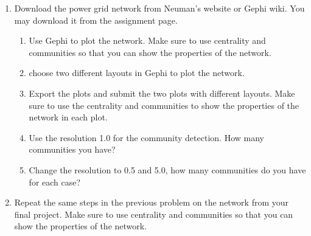 \documentclass{amsart}
\theoremstyle{definition}
\theoremstyle{remark}
\numberwithin{equation}{section}
\begin{document}
\begin{enumerate}
\item Download the power grid network from Neuman's website or Gephi wiki. You may download it from the assignment page. 
\begin{enumerate}
\item Use Gephi to plot the network. Make sure to use centrality and communities so that you can show the properties of the network.
\item choose two different layouts in Gephi to plot the network. 
\item Export the plots and submit the two plots with different layouts. Make sure to use the centrality and communities to show the properties of the network in each plot.
\item Use the resolution 1.0 for the community detection. How many communities you have? 
\item Change the resolution to 0.5 and 5.0, how many communities do you  have for each case?
\end{enumerate}
\vspace{1cm}

\item  Repeat the same steps in the previous problem on the network from your final project. Make sure to use centrality and communities so that you can show the properties of the network.

\end{enumerate}
\end{document}
